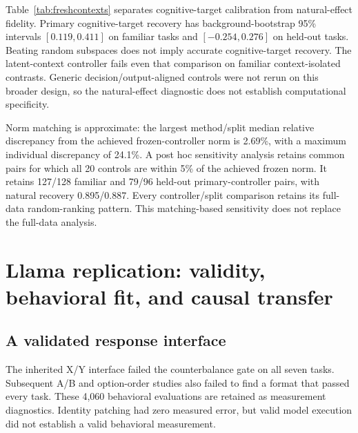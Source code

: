 \documentclass{article}
\begin{document}
\begin{table}[htbp]
\centering\small

\caption{Fresh-context results for every frozen controller. Random $p$ compares cognitive-target recovery with 20 random subspaces; the minimum plus-one value is $1/21$. These descriptive comparisons are not multiplicity corrected. *Natural-effect recovery is a secondary diagnostic specified during the run. All six natural-effect comparisons exceed every sampled random control.}
\label{tab:freshcontexts}
\end{table}

Table~\ref{tab:freshcontexts} separates cognitive-target calibration from natural-effect fidelity. Primary cognitive-target recovery has background-bootstrap 95\% intervals $[0.119,0.411]$ on familiar tasks and $[-0.254,0.276]$ on held-out tasks. Beating random subspaces does not imply accurate cognitive-target recovery. The latent-context controller fails even that comparison on familiar context-isolated contrasts. Generic decision/output-aligned controls were not rerun on this broader design, so the natural-effect diagnostic does not establish computational specificity.

Norm matching is approximate: the largest method/split median relative discrepancy from the achieved frozen-controller norm is 2.69\%, with a maximum individual discrepancy of 24.1\%. A post hoc sensitivity analysis retains common pairs for which all 20 controls are within 5\% of the achieved frozen norm. It retains 127/128 familiar and 79/96 held-out primary-controller pairs, with natural recovery 0.895/0.887. Every controller/split comparison retains its full-data random-ranking pattern. This matching-based sensitivity does not replace the full-data analysis.

\section{Llama replication: validity, behavioral fit, and causal transfer}\label{app:llama}
\subsection{A validated response interface}
The inherited X/Y interface failed the counterbalance gate on all seven tasks. Subsequent A/B and option-order studies also failed to find a format that passed every task. These 4,060 behavioral evaluations are retained as measurement diagnostics. Identity patching had zero measured error, but valid model execution did not establish a valid behavioral measurement.
\end{document}
